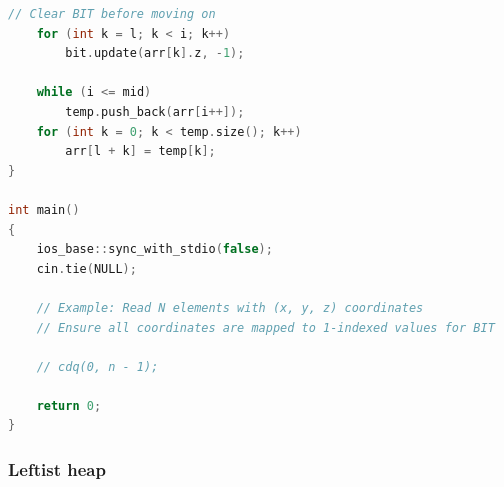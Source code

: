 \documentclass[10pt,landscape,a4paper,twocolumn]{article}
\begin{document}
\begin{lstlisting}[language=C++]
    // Clear BIT before moving on
    for (int k = l; k < i; k++)
        bit.update(arr[k].z, -1);

    while (i <= mid)
        temp.push_back(arr[i++]);
    for (int k = 0; k < temp.size(); k++)
        arr[l + k] = temp[k];
}

int main()
{
    ios_base::sync_with_stdio(false);
    cin.tie(NULL);

    // Example: Read N elements with (x, y, z) coordinates
    // Ensure all coordinates are mapped to 1-indexed values for BIT

    // cdq(0, n - 1);

    return 0;
}
\end{lstlisting}
\subsubsection{Leftist heap}
\end{document}
